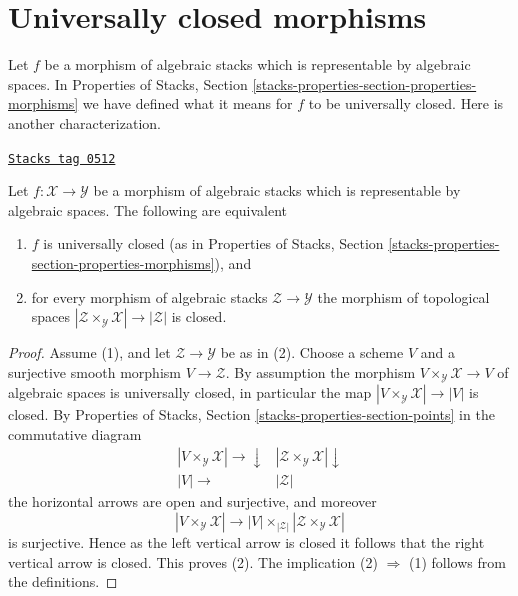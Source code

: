 \section{Universally closed morphisms}
\label{stacks-morphisms-section-universally-closed}
Let $f$ be a morphism of algebraic stacks which is representable by
algebraic spaces. In
Properties of Stacks, Section
\ref{stacks-properties-section-properties-morphisms}
we have defined what it means for $f$ to be universally closed.
Here is another characterization.

\begin{lemma}
\label{stacks-morphisms-lemma-characterize-representable-universally-closed}
\href{https://stacks.math.columbia.edu/tag/0512}{\texttt{Stacks tag 0512}}

Let $f : \mathcal{X} \to \mathcal{Y}$ be a morphism of
algebraic stacks which is representable by algebraic spaces.
The following are equivalent
\begin{enumerate}
\item $f$ is universally closed (as in Properties of Stacks,
Section \ref{stacks-properties-section-properties-morphisms}), and
\item for every morphism of algebraic stacks $\mathcal{Z} \to \mathcal{Y}$
the morphism of topological spaces
$|\mathcal{Z} \times_\mathcal{Y} \mathcal{X}| \to |\mathcal{Z}|$ is closed.
\end{enumerate}
\end{lemma}

\begin{proof}
Assume (1), and let $\mathcal{Z} \to \mathcal{Y}$ be as in (2).
Choose a scheme $V$ and a surjective smooth morphism $V \to \mathcal{Z}$.
By assumption the morphism $V \times_\mathcal{Y} \mathcal{X} \to V$
of algebraic spaces is universally closed, in particular the map
$|V \times_\mathcal{Y} \mathcal{X}| \to |V|$ is closed. By
Properties of Stacks, Section \ref{stacks-properties-section-points}
in the commutative diagram
$$
\begin{array}{cc}|V \times_\mathcal{Y} \mathcal{X}| \longrightarrow\downarrow & |\mathcal{Z} \times_\mathcal{Y} \mathcal{X}| \downarrow \\ |V| \longrightarrow & |\mathcal{Z}|\end{array}
$$
the horizontal arrows are open and surjective, and moreover
$$
|V \times_\mathcal{Y} \mathcal{X}| \longrightarrow
|V| \times_{|\mathcal{Z}|} |\mathcal{Z} \times_\mathcal{Y} \mathcal{X}|
$$
is surjective. Hence as the left vertical arrow is closed it follows that
the right vertical arrow is closed. This proves (2).
The implication (2) $\Rightarrow$ (1) follows from the definitions.
\end{proof}

